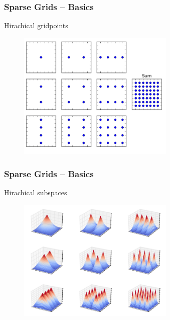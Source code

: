 \begin{frame}
  \frametitle{Sparse Grids -- Basics}
  \topline
  \vspace{-10px}
  \begin{block}{Hirachical gridpoints}
    \begin{figure}[!htp]
      \centering
      \includegraphics[width=7.5cm]{images/sparsegrid_hirach1}
      \vspace{-12px}
      \caption{}
    \end{figure}
  \end{block}
\end{frame}

\begin{frame}
  \frametitle{Sparse Grids -- Basics}
  \topline
  \vspace{-10px}
  \begin{block}{Hirachical subspaces}
    \begin{figure}[!htp]
      \centering
      \includegraphics[width=7.5cm]{images/sparsegrid_2dhats}
      \vspace{-12px}
      \caption{}
    \end{figure}
  \end{block}
\end{frame}

